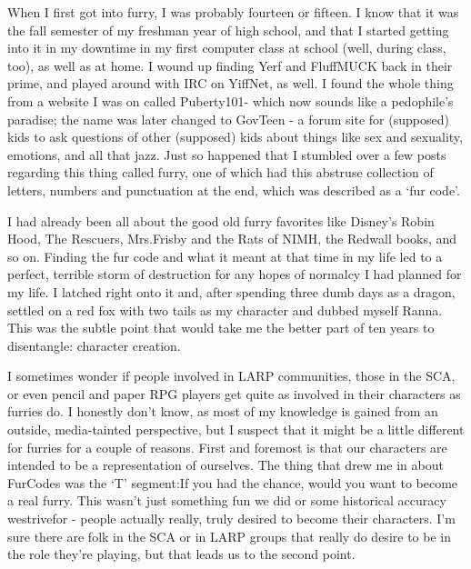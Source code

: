 
When I first got into furry, I was probably fourteen or fifteen. I know that it was the fall semester of my freshman year of high school, and that I started getting into it in my downtime in my first computer class at school (well, during class, too), as well as at home. I wound up finding Yerf and FluffMUCK back in their prime, and played around with IRC on YiffNet, as well. I found the whole thing from a website I was on called Puberty101- which now sounds like a pedophile's paradise; the name was later changed to GovTeen - a forum site for (supposed) kids to ask questions of other (supposed) kids about things like sex and sexuality, emotions, and all that jazz. Just so happened that I stumbled over a few posts regarding this thing called furry, one of which had this abstruse collection of letters, numbers and punctuation at the end, which was described as a `fur code'.

I had already been all about the good old furry favorites like Disney's Robin Hood, The Rescuers, Mrs.Frisby and the Rats of NIMH, the Redwall books, and so on. Finding the fur code and what it meant at that time in my life led to a perfect, terrible storm of destruction for any hopes of normalcy I had planned for my life. I latched right onto it and, after spending three dumb days as a dragon, settled on a red fox with two tails as my character and dubbed myself Ranna. This was the subtle point that would take me the better part of ten years to disentangle: character creation.

I sometimes wonder if people involved in LARP communities, those in the SCA, or even pencil and paper RPG players get quite as involved in their characters as furries do. I honestly don't know, as most of my knowledge is gained from an outside, media-tainted perspective, but I suspect that it might be a little different for furries for a couple of reasons. First and foremost is that our characters are intended to be a representation of ourselves. The thing that drew me in about FurCodes was the `T' segment:If you had the chance, would you want to become a real furry. This wasn't just something fun we did or some historical accuracy westrivefor - people actually really, truly desired to become their characters. I'm sure there are folk in the SCA or in LARP groups that really do desire to be in the role they're playing, but that leads us to the second point.

